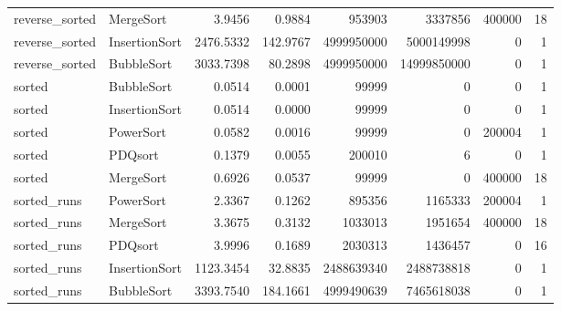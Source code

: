 \begin{table}[htbp]
{\begin{tabular}{llrrrrrr}
reverse\_sorted & MergeSort & 3.9456 & 0.9884 & 953903 & 3337856 & 400000 & 18 \\
reverse\_sorted & InsertionSort & 2476.5332 & 142.9767 & 4999950000 & 5000149998 & 0 & 1 \\
reverse\_sorted & BubbleSort & 3033.7398 & 80.2898 & 4999950000 & 14999850000 & 0 & 1 \\
sorted & BubbleSort & 0.0514 & 0.0001 & 99999 & 0 & 0 & 1 \\
sorted & InsertionSort & 0.0514 & 0.0000 & 99999 & 0 & 0 & 1 \\
sorted & PowerSort & 0.0582 & 0.0016 & 99999 & 0 & 200004 & 1 \\
sorted & PDQsort & 0.1379 & 0.0055 & 200010 & 6 & 0 & 1 \\
sorted & MergeSort & 0.6926 & 0.0537 & 99999 & 0 & 400000 & 18 \\
sorted\_runs & PowerSort & 2.3367 & 0.1262 & 895356 & 1165333 & 200004 & 1 \\
sorted\_runs & MergeSort & 3.3675 & 0.3132 & 1033013 & 1951654 & 400000 & 18 \\
sorted\_runs & PDQsort & 3.9996 & 0.1689 & 2030313 & 1436457 & 0 & 16 \\
sorted\_runs & InsertionSort & 1123.3454 & 32.8835 & 2488639340 & 2488738818 & 0 & 1 \\
sorted\_runs & BubbleSort & 3393.7540 & 184.1661 & 4999490639 & 7465618038 & 0 & 1 \\
\hline
\end{tabular}%
}
\end{table}
